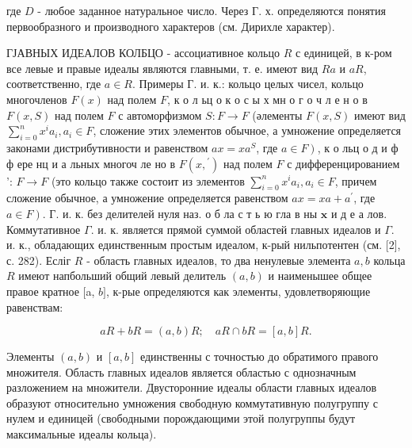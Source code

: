 \documentclass[10pt]{article}
\begin{document}
где $D$ - любое заданное натуральное число. Через Г. х. определяются понятия первообразного и производного характеров (см. Дирихле характер).



ГЈАВНЫХ ИДЕАЛОВ КОЛБЦО - ассоциативное кольцо $R$ с единицей, в к-ром все левые и правые идеалы являются главными, т. е. имеют вид $R a$ и $a R$, соответственно, где $a \in R$. Примеры $Г$. и. к.: кольцо целых чисел, кольцо многочленов $F(x)$ над полем $F$, к о л ьц о к о с ы х мн о г о ч л е н о в $F(x, S)$ над полем $F$ с автоморфизмом $S: F \rightarrow F$ (әлементы $F(x, S)$ имеют вид $\sum_{i=0}^{n} x^{i} a_{i}, a_{i} \in F$, сложение этих элементов обычное, а умножение определяется законами дистрибутивности и равенством $a x=x a^{S}$, где $\left.a \in F\right)$, к о льц о д и ф ф ере нц и а льных многоч ле но в $F\left(x,{ }^{\prime}\right)$ над полем $F$ с дифференцированием ': $F \rightarrow F$ (это кольцо также состоит из элементов $\sum_{i=0}^{n} x^{i} a_{i}, a_{i} \in F$, причем сложение обычное, а умножение определяется равенством $a x=x a+a^{\prime}$, где $\left.a \in F\right)$. Г. и. к. без делителей нуля наз. о б ла с т ь ю $г л а$ в ны $\mathbf{x}$ и д е а лов. Коммутативное $\Gamma$. и. к. является прямой суммой областей главных идеалов и $\Gamma$. и. к., обладающих единственным простым идеалом, к-рый нильпотентен (см. [2], с. 282). Есліг $R$ - область главных идеалов, то два ненулевые элемента $a, b$ кольца $R$ имеют напбольший общий левый делитель $(a, b)$ и наименышее общее правое кратное [a, $b]$, к-рые определяются как элементы, удовлетворяющие равенствам:



\[

a R+b R=(a, b) R ; \quad a R \cap b R=[a, b] R .

\]



Элементы $(a, b)$ и $[a, b]$ единственны с точностью до обратимого правого множителя. Область главных идеалов является областью с однозначным разложением на множители. Двусторонние идеалы области главных идеалов образуют относительно умножения свободную коммутативную полугруппу с нулем и единицей (свободными порождающими этой полугруппы будут максимальные идеалы кольца).
\end{document}
